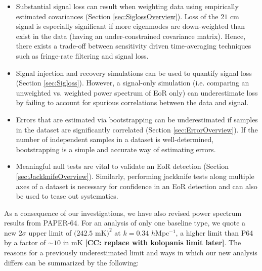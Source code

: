 \documentclass[preprint2,numberedappendix,tighten]{aastex6}  %
\newcommand{\cc}[1]{{\color{purple} \textbf{[CC: #1]}}}
\begin{document}
\begin{itemize}
\item Substantial signal loss can result when weighting data using empirically estimated covariances (Section 
\ref{sec:SiglossOverview}). Loss of the $21$ cm signal is especially significant if more eigenmodes are down-weighted than 
exist in the data (having an under-constrained covariance matrix). Hence, there exists a trade-off between sensitivity driven 
time-averaging techniques such as fringe-rate filtering and signal loss. 
\item Signal injection and recovery simulations can be used to quantify signal loss (Section \ref{sec:Sigloss}). However, a 
signal-only simulation (i.e. comparing an unweighted vs. weighted power spectrum of EoR only) can underestimate loss by 
failing to account for spurious correlations between the data and signal.
\item Errors that are estimated via bootstrapping can be underestimated if samples in the dataset are significantly correlated 
(Section \ref{sec:ErrorOverview}). If the number of independent samples in a dataset is well-determined, bootstrapping is a 
simple and accurate way of estimating errors.
\item Meaningful null tests are vital to validate an EoR detection (Section \ref{sec:JackknifeOverview}). Similarly, performing 
jackknife tests along multiple axes of a dataset is necessary for confidence in an EoR detection and can also be used to tease 
out systematics.
\end{itemize}

As a consequence of our investigations, we have also revised power spectrum results from PAPER-64. For an analysis of only 
one baseline type, we quote a new $2\sigma$ upper limit of $(242.5$ mK$)^{2}$ at $k=0.34$ $h$Mpc$^{-1}$, a higher limit than 
P64 by a factor of $\sim10$ in mK \cc{replace with kolopanis limit later}. The reasons for a previously underestimated limit and 
ways in which our new analysis differs can be summarized by the following:
\end{document}

